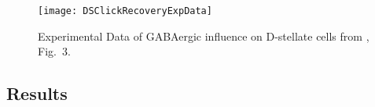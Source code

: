 %











\begin{figure}[htb]
\texttt{[image: DSClickRecoveryExpData]}\label{Ch3:fig:DSClickRecoveryExpData}
\caption{Experimental Data of GABAergic influence on D-stellate cells from \citep{BackoffPalombiEtAl:1997}, Fig.~3.}
\end{figure}



\clearpage
\subsection{Results}


